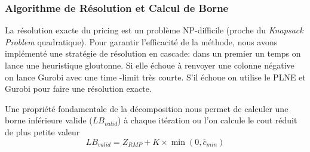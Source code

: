 \documentclass{article}
\begin{document}
\subsubsection{Algorithme de Résolution et Calcul de Borne}

La résolution exacte du pricing est un problème NP-difficile (proche du \textit{Knapsack Problem} quadratique). Pour garantir l'efficacité de la méthode, nous avons implémenté une stratégie de résolution en cascade: dans un premier un temps on lance une heuristique gloutonne. Si elle échoue à renvoyer une colonne négative on lance Gurobi avec une time -limit très courte. S'il échoue on utilise le PLNE et Gurobi pour faire une résolution exacte.

Une propriété fondamentale de la décomposition nous permet de calculer une borne inférieure valide ($LB_{valid}$) à chaque itération ou l'on calcule le cout réduit de plus petite valeur 
$$ LB_{valid} = Z_{RMP} + K \times \min(0, \bar{c}_{min}) $$
\end{document}
